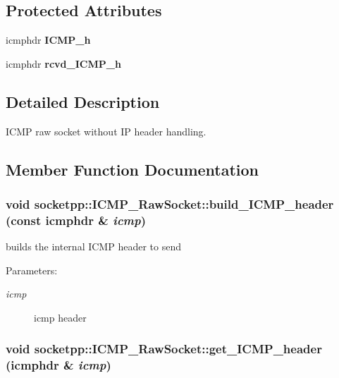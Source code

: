 \subsection*{Protected Attributes}
\begin{CompactItemize}
\item 
\hypertarget{classsocketpp_1_1ICMP__RawSocket_31f1ab3a8beaf8d4cb5b192e644e3f33}{
icmphdr \textbf{ICMP\_\-h}}
\label{classsocketpp_1_1ICMP__RawSocket_31f1ab3a8beaf8d4cb5b192e644e3f33}

\item 
\hypertarget{classsocketpp_1_1ICMP__RawSocket_1304716643ef2274b8c1c195359110c6}{
icmphdr \textbf{rcvd\_\-ICMP\_\-h}}
\label{classsocketpp_1_1ICMP__RawSocket_1304716643ef2274b8c1c195359110c6}

\end{CompactItemize}


\subsection{Detailed Description}
ICMP raw socket without IP header handling. 

\subsection{Member Function Documentation}
\hypertarget{classsocketpp_1_1ICMP__RawSocket_7d8d54d4771f4012246835819421fbeb}{
\subsubsection[{build\_\-ICMP\_\-header}]{\setlength{\rightskip}{0pt plus 5cm}void socketpp::ICMP\_\-RawSocket::build\_\-ICMP\_\-header (const icmphdr \& {\em icmp})}}
\label{classsocketpp_1_1ICMP__RawSocket_7d8d54d4771f4012246835819421fbeb}


builds the internal ICMP header to send 

\begin{Desc}
\item[Parameters:]
\begin{description}
\item[{\em icmp}]icmp header \end{description}
\end{Desc}
\hypertarget{classsocketpp_1_1ICMP__RawSocket_9b0ed9bb87d2895f2302db13b7ca5f06}{
\subsubsection[{get\_\-ICMP\_\-header}]{\setlength{\rightskip}{0pt plus 5cm}void socketpp::ICMP\_\-RawSocket::get\_\-ICMP\_\-header (icmphdr \& {\em icmp})}}
\label{classsocketpp_1_1ICMP__RawSocket_9b0ed9bb87d2895f2302db13b7ca5f06}



